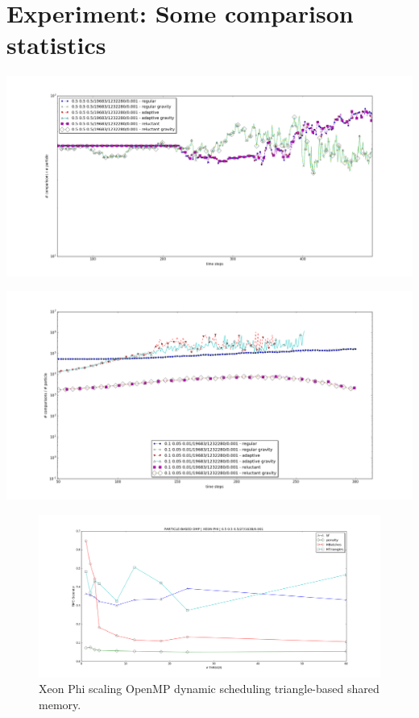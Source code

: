 \section{Experiment: Some comparison statistics}
\label{section:experiment:comparison-statistics}

\begin{center}
  \includegraphics[width=1\textwidth]{experiments/random/no-of-collisions/comparison_log_0.png}
\end{center}

\begin{center}
 	\includegraphics[width=1\textwidth]{experiments/random/no-of-collisions/comparison_log_2.png}
\end{center}

\begin{figure}[htb]
  \begin{center}
    \includegraphics[width=1\textwidth]{experiments/random/omp/xeon_phi_regular_G0_particle_dynamic.png}
  \end{center}
  \caption{Xeon Phi scaling OpenMP dynamic scheduling triangle-based shared memory.}
  \label{figure:triangle_omp}
\end{figure}

